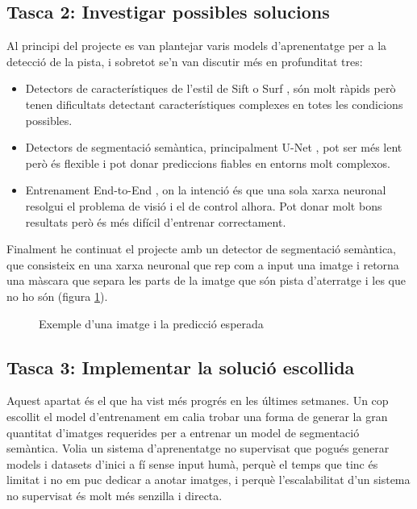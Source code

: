 \documentclass[10pt,a4paper,twocolumn,twoside]{article}
\begin{document}
\subsection{Tasca 2: Investigar possibles solucions}
Al principi del projecte es van plantejar varis models d'aprenentatge per a la detecció de la pista, i sobretot se'n van discutir més en profunditat tres:
\begin{itemize}
    \item{Detectors de característiques de l'estil de Sift o Surf \cite{khan2011sift}, són molt ràpids però tenen dificultats detectant característiques complexes en totes les condicions possibles.}
    \item{Detectors de segmentació semàntica, principalment U-Net \cite{ronneberger2015u}, pot ser més lent però és flexible i pot donar prediccions fiables en entorns molt complexos.}
    \item{Entrenament End-to-End \cite{bojarski2016end}, on la intenció és que una sola xarxa neuronal resolgui el problema de visió i el de control alhora. Pot donar molt bons resultats però és més difícil d'entrenar correctament.}
\end{itemize}

Finalment he continuat el projecte amb un detector de segmentació semàntica, que consisteix en una xarxa neuronal que rep com a input una imatge
i retorna una màscara que separa les parts de la imatge que són pista d'aterratge i les que no ho són (figura \ref{fig-img-seg-exmpl}).

\begin{figure}[h]
\centering
{}
    \caption{Exemple d'una imatge i la predicció esperada}
    \label{fig-img-seg-exmpl}
\end{figure}

\subsection{Tasca 3: Implementar la solució escollida}
Aquest apartat és el que ha vist més progrés en les últimes setmanes. Un cop escollit el model d'entrenament em calia trobar una forma de generar
la gran quantitat d'imatges requerides per a entrenar un model de segmentació semàntica. Volia un sistema d'aprenentatge no supervisat que pogués
generar models i datasets d'inici a fí sense input humà, perquè el temps que tinc és limitat i no em puc dedicar a anotar imatges, i perquè 
l'escalabilitat d'un sistema no supervisat és molt més senzilla i directa.
\end{document}
